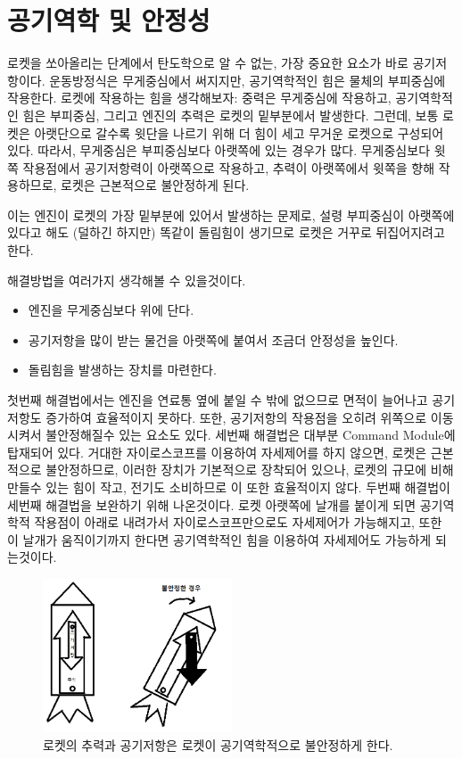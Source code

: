 \documentclass[9pt]{amsbook}
\begin{document}
\section{공기역학 및 안정성}
로켓을 쏘아올리는 단계에서 탄도학으로 알 수 없는, 가장 중요한 요소가 바로 공기저항이다. 
운동방정식은 무게중심에서 써지지만, 공기역학적인 힘은 물체의 부피중심에 작용한다. 
로켓에 작용하는 힘을 생각해보자: 중력은 무게중심에 작용하고, 공기역학적인 힘은 부피중심, 그리고 엔진의 추력은 로켓의 밑부분에서 발생한다. 그런데, 보통 로켓은 아랫단으로 갈수록 윗단을 나르기 위해 더 힘이 세고 무거운 로켓으로 구성되어 있다. 따라서, 무게중심은 부피중심보다 아랫쪽에 있는 경우가 많다. 무게중심보다 윗쪽 작용점에서 공기저항력이 아랫쪽으로 작용하고, 추력이 아랫쪽에서 윗쪽을 향해 작용하므로, 로켓은 근본적으로 불안정하게 된다.

이는 엔진이 로켓의 가장 밑부분에 있어서 발생하는 문제로, 설령 부피중심이 아랫쪽에 있다고 해도 (덜하긴 하지만) 똑같이 돌림힘이 생기므로 로켓은 거꾸로 뒤집어지려고 한다.

해결방법을 여러가지 생각해볼 수 있을것이다.
\begin{itemize}
\item 엔진을 무게중심보다 위에 단다.
\item 공기저항을 많이 받는 물건을 아랫쪽에 붙여서 조금더 안정성을 높인다.
\item 돌림힘을 발생하는 장치를 마련한다.
\end{itemize}

첫번째 해결법에서는 엔진을 연료통 옆에 붙일 수 밖에 없으므로 면적이 늘어나고 공기저항도 증가하여 효율적이지 못하다. 또한, 공기저항의 작용점을 오히려 위쪽으로 이동시켜서 불안정해질수 있는 요소도 있다.
세번째 해결법은 대부분 Command Module에 탑재되어 있다. 거대한 자이로스코프를 이용하여 자세제어를 하지 않으면, 로켓은 근본적으로 불안정하므로, 이러한 장치가 기본적으로 장착되어 있으나, 로켓의 규모에 비해 만들수 있는 힘이 작고, 전기도 소비하므로 이 또한 효율적이지 않다.
두번째 해결법이 세번째 해결법을 보완하기 위해 나온것이다. 로켓 아랫쪽에 날개를 붙이게 되면 공기역학적 작용점이 아래로 내려가서 자이로스코프만으로도 자세제어가 가능해지고, 또한 이 날개가 움직이기까지 한다면 공기역학적인 힘을 이용하여 자세제어도 가능하게 되는것이다.

\begin{figure}
\caption{로켓의 추력과 공기저항은 로켓이 공기역학적으로 불안정하게 한다. }
\begin{center}
\includegraphics[width=0.5\textwidth]{aero.png}
\end{center}
\end{figure}
\end{document}
